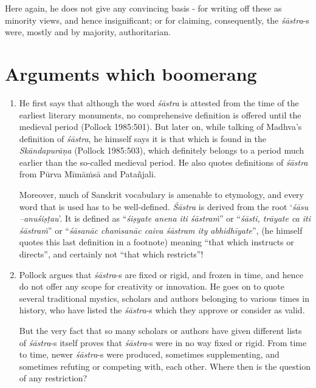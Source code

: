 \begin{enumerate}
Here again, he does not give any convincing basis - for writing off these as minority views, and hence insignificant; or for claiming, consequently, the {\it śāstra}-s were, mostly and by majority, authoritarian. 
\end{enumerate}

\section*{Arguments which boomerang}

\begin{enumerate}
\item He first says that although the word {\it śāstra} is attested from the time of the earliest literary monuments, no comprehensive definition is offered until the medieval period (Pollock 1985:501). But later on, while talking of Madhva's definition of {\it śāstra}, he himself says it is that which is found in the {\it Skāndapurāṇa} (Pollock 1985:503), which definitely belongs to a period much earlier than the so-called medieval period. He also quotes definitions of {\it śāstra} from Pūrva Mīmāṁsā and Patañjali. 

Moreover, much of Sanskrit vocabulary is amenable to  etymology, and every word that is used has to be well-defined. {\it Śāstra} is derived from the root `\textsl{śāsu --anuśiṣṭau}'. It is defined as ``\textsl{śiṣyate anena iti śāstraṁ}'' or ``\textsl{śāsti, trāyate ca iti śāstraṁ}'' or ``\textsl{śāsanāc chaṁsanāc caiva śāstram ity abhidhīyate}'', (he himself quotes this last definition in a footnote) meaning ``that which instructs or directs'', and certainly not ``that which restricts''!

\item Pollock argues that {\it śāstra}-s are fixed or rigid, and frozen in time, and hence do not offer any scope for creativity or innovation. He goes on to quote several traditional mystics, scholars and authors belonging to various times in history, who have listed the {\it śāstra}-s which they approve or consider as valid. 

But the very fact that so many scholars or authors have given different lists of {\it śāstra}-s itself proves that {\it śāstra}-s were in no way fixed or rigid. From time to time, newer {\it śāstra}-s were produced, sometimes supplementing, and sometimes refuting or competing with, each other. Where then is the question of any restriction?
\end{enumerate}

